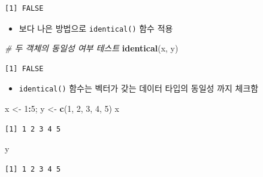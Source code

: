 \documentclass[
  11pt,
]{krantz}
\newenvironment{Shaded}{\begin{snugshade}}{\end{snugshade}}
\newcommand{\CommentTok}[1]{\textcolor[rgb]{0.37,0.37,0.37}{\textit{#1}}}
\newcommand{\DecValTok}[1]{\textcolor[rgb]{0.06,0.06,0.06}{#1}}
\newcommand{\KeywordTok}[1]{\textcolor[rgb]{0.27,0.27,0.27}{\textbf{#1}}}
\newcommand{\NormalTok}[1]{#1}
\newcommand{\OperatorTok}[1]{\textcolor[rgb]{0.43,0.43,0.43}{\textbf{#1}}}
\newcommand{\StringTok}[1]{\textcolor[rgb]{0.5,0.5,0.5}{#1}}
\providecommand{\tightlist}{%
  \setlength{\itemsep}{0pt}\setlength{\parskip}{0pt}}
\begin{document}
\begin{verbatim}
[1] FALSE
\end{verbatim}

\normalsize

\begin{itemize}
\tightlist
\item
  보다 나은 방법으로 \texttt{identical()} 함수 적용
\end{itemize}

\footnotesize

\begin{Shaded}
\begin{Highlighting}[]
\CommentTok{# 두 객체의 동일성 여부 테스트}
\KeywordTok{identical}\NormalTok{(x, y)}
\end{Highlighting}
\end{Shaded}

\begin{verbatim}
[1] FALSE
\end{verbatim}

\normalsize

\begin{itemize}
\tightlist
\item
  \texttt{identical()} 함수는 벡터가 갖는 데이터 타입의 동일성 까지 체크함
\end{itemize}

\footnotesize

\begin{Shaded}
\begin{Highlighting}[]
\NormalTok{x <-}\StringTok{ }\DecValTok{1}\OperatorTok{:}\DecValTok{5}\NormalTok{; y <-}\StringTok{ }\KeywordTok{c}\NormalTok{(}\DecValTok{1}\NormalTok{, }\DecValTok{2}\NormalTok{, }\DecValTok{3}\NormalTok{, }\DecValTok{4}\NormalTok{, }\DecValTok{5}\NormalTok{)}
\NormalTok{x}
\end{Highlighting}
\end{Shaded}

\begin{verbatim}
[1] 1 2 3 4 5
\end{verbatim}

\begin{Shaded}
\begin{Highlighting}[]
\NormalTok{y}
\end{Highlighting}
\end{Shaded}

\begin{verbatim}
[1] 1 2 3 4 5
\end{verbatim}
\end{document}
